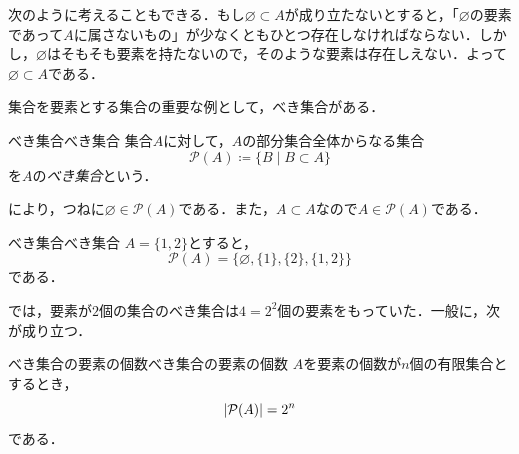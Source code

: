 \begin{remark}[背理法による見方]
  次のように考えることもできる．もし$\varnothing \subset A$が成り立たないとすると，「$\varnothing$の要素であって$A$に属さないもの」が少なくともひとつ存在しなければならない．しかし，$\varnothing$はそもそも要素を持たないので，そのような要素は存在しえない．よって$\varnothing \subset A$である．
\end{remark}

集合を要素とする集合の重要な例として，べき集合がある．

\begin{definition}{べき集合}{べき集合}
  集合$A$に対して，$A$の部分集合全体からなる集合
  \[
    \mathcal{P}(A) \coloneqq \{ B \mid B \subset A \}
  \]
  を$A$の\emph{べき集合}という．
\end{definition}

により，つねに$\varnothing \in \mathcal{P}(A)$である．また，$A \subset A$なので$A \in \mathcal{P}(A)$である．

\begin{example}{べき集合}{べき集合}
  $A=\{ 1, 2\}$とすると，
  \[
    \mathcal{P}(A) = \{ \varnothing, \{1\}, \{2\}, \{1, 2\}\}
  \]
  である．
\end{example}

では，要素が$2$個の集合のべき集合は$4 = 2^2$個の要素をもっていた．一般に，次が成り立つ．

\begin{prop}{べき集合の要素の個数}{べき集合の要素の個数}
  $A$を要素の個数が$n$個の有限集合とするとき，
  \[
    \lvert\mathcal{P}(A)\rvert = 2^n
  \]
  である．
\end{prop}

